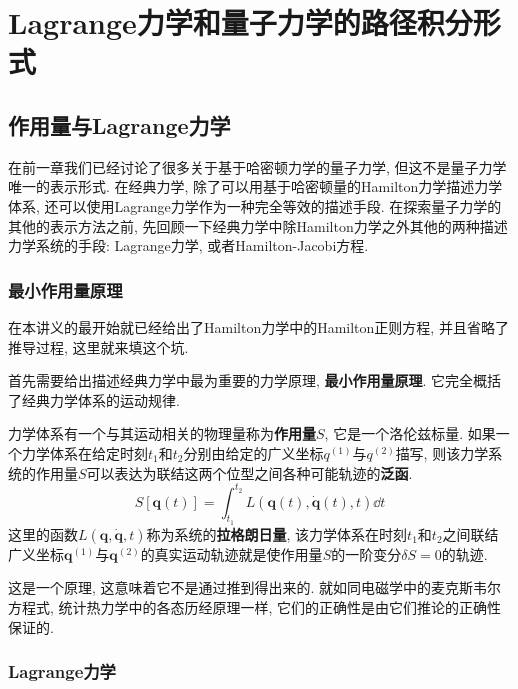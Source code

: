 \chapter{Lagrange力学和量子力学的路径积分形式}
    \section{作用量与Lagrange力学}

        在前一章我们已经讨论了很多关于基于哈密顿力学的量子力学, 但这不是量子力学唯一的表示形式. 在经典力学, 除了可以用基于哈密顿量的Hamilton力学描述力学体系, 还可以使用Lagrange力学作为一种完全等效的描述手段. 在探索量子力学的其他的表示方法之前, 先回顾一下经典力学中除Hamilton力学之外其他的两种描述力学系统的手段: Lagrange力学, 或者Hamilton-Jacobi方程. 

        \subsection{最小作用量原理}

        在本讲义的最开始就已经给出了Hamilton力学中的Hamilton正则方程, 并且省略了推导过程, 这里就来填这个坑. 

        首先需要给出描述经典力学中最为重要的力学原理, \textbf{最小作用量原理}. 它完全概括了经典力学体系的运动规律.

        \begin{law}[最小作用量原理]
            力学体系有一个与其运动相关的物理量称为\textbf{作用量}$S$, 它是一个洛伦兹标量. 如果一个力学体系在给定时刻$t_1$和$t_2$分别由给定的广义坐标$q^{(1)}$与$q^{(2)}$描写, 则该力学系统的作用量$S$可以表达为联结这两个位型之间各种可能轨迹的\textbf{泛函}. 
            \begin{equation}
                S[\bm q(t)] = \int_{t_1}^{t_2} L( \bm q(t), \dot{\bm q}(t), t ) \dd t
            \end{equation}
            这里的函数$L(\bm q,\dot{\bm q},t)$称为系统的\textbf{拉格朗日量}, 该力学体系在时刻$t_1$和$t_2$之间联结广义坐标$\bm q^{(1)}$与$\bm q^{(2)}$的真实运动轨迹就是使作用量$S$的一阶变分$\delta S = 0$的轨迹\cite{刘川理力}.
        \end{law}

        这是一个原理, 这意味着它不是通过推到得出来的. 就如同电磁学中的麦克斯韦尔方程式, 统计热力学中的各态历经原理一样, 它们的正确性是由它们推论的正确性保证的. 

        \subsection{Lagrange力学}

